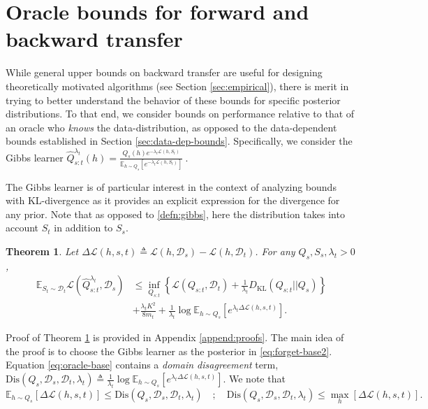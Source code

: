 \documentclass{article}
\theoremstyle{plain}
\newtheorem{theorem}{Theorem}[section]
\theoremstyle{definition}
\theoremstyle{remark}
\begin{document}
\section{Oracle bounds for forward and backward transfer}\label{sec:oracle-bounds}

While general upper bounds on backward transfer are useful for designing theoretically motivated algorithms (see Section \ref{sec:empirical}), there is merit in trying to better understand the behavior of these bounds for specific posterior distributions. To that end, we consider bounds on performance relative to that of an oracle who \emph{knows} the data-distribution, as opposed to the data-dependent bounds established in Section \ref{sec:data-dep-bounds}. Specifically, we consider the Gibbs learner
$
\hat{Q}^{\lambda_t}_{s:t}(h)=\frac{Q_s(h)e^{-\lambda_t\mathcal{L}(h,S_t)}}{\mathbb{E}_{h\sim Q_s}\left [e^{-\lambda_t\mathcal{L}(h,S_t)}\right ]}~. 
$

The Gibbs learner is of particular interest in the context of analyzing bounds with KL-divergence as it provides an explicit expression for the divergence for any prior.
Note that as opposed to \eqref{defn:gibbs}, here the distribution takes into account $S_t$ in addition to $S_s$.

\begin{theorem} \label{thm:oracle-base}
Let $\Delta \mathcal{L}(h,s,t)\triangleq \mathcal{L}(h,\mathcal{D}_s)-\mathcal{L}(h,\mathcal{D}_t)$. For any $Q_s, S_s, \lambda_t>0$, 
\begin{align} \label{eq:oracle-base}
\mathbb{E}_{S_t\sim \mathcal{D}_t}\mathcal{L}( \hat{Q}^{\lambda_t}_{s:t},\mathcal{D}_s)&\leq \nonumber  
\inf_{Q_{s:t}}\left \{ \mathcal{L}(Q_{s:t},\mathcal{D}_t) + \frac{1}{\lambda_t}D_{\mathrm{KL}}(Q_{s:t}||Q_{s}) \right \} \\
&+\frac{\lambda_t K^2}{8m_t}+\frac{1}{\lambda_t}\log\mathbb{E}_{h\sim Q_s}\left [e^{\lambda_t\Delta \mathcal{L}(h,s,t)} \right ].%
\end{align}
%
\end{theorem}
%
Proof of Theorem \ref{thm:oracle-base} is provided in Appendix \ref{append:proofs}. 
The main idea of the proof is to choose the Gibbs learner as the posterior in \eqref{eq:forget-base2}.
Equation \eqref{eq:oracle-base} contains a \emph{domain disagreement} term, $\mathrm{Dis}(Q_s,\mathcal{D}_s, \mathcal{D}_t, \lambda_t )\triangleq\frac{1}{\lambda_t}\log\mathbb{E}_{h\sim Q_s}\left [e^{\lambda_t\Delta \mathcal{L}(h,s,t)} \right ].$
We note that   
$$\mathbb{E}_{h\sim Q_s}\left [\Delta \mathcal{L}(h,s,t) \right ] \leq \mathrm{Dis}(Q_s,\mathcal{D}_s, \mathcal{D}_t, \lambda_t )\quad ; \quad\mathrm{Dis}(Q_s,\mathcal{D}_s, \mathcal{D}_t, \lambda_t )\leq \max_{h}\left [\Delta \mathcal{L}(h,s,t) \right ].$$
\end{document}
